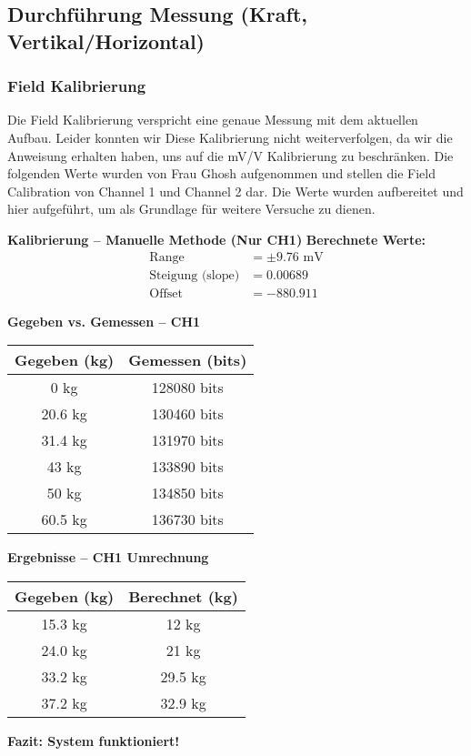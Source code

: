 \subsection{Durchf\"uhrung Messung (Kraft, Vertikal/Horizontal)}
\subsubsection{Field Kalibrierung}
Die Field Kalibrierung verspricht eine genaue Messung mit dem aktuellen Aufbau. Leider konnten wir Diese Kalibrierung nicht weiterverfolgen, da wir die Anweisung erhalten haben, uns auf die mV/V Kalibrierung zu beschränken. 
Die folgenden Werte wurden von Frau Ghosh aufgenommen und stellen die Field Calibration von Channel 1 und Channel 2 dar. Die Werte wurden aufbereitet und hier aufgeführt, um als Grundlage für weitere Versuche zu dienen. 

\textbf{Kalibrierung – Manuelle Methode (Nur CH1)}
\textbf{Berechnete Werte:}
\begin{align*}
\text{Range} &= \pm 9.76 \text{ mV} \\
\text{Steigung (slope)} &= 0.00689 \\
\text{Offset} &= -880.911
\end{align*}

\clearpage
\textbf{Gegeben vs. Gemessen – CH1}
\begin{center}
\begin{tabular}{|c|c|}
\hline
\textbf{Gegeben (kg)} & \textbf{Gemessen (bits)} \\
\hline
0 kg & 128080 bits \\
20.6 kg & 130460 bits \\
31.4 kg & 131970 bits \\
43 kg & 133890 bits \\
50 kg & 134850 bits \\
60.5 kg & 136730 bits \\
\hline
\end{tabular}
\end{center}

\textbf{Ergebnisse – CH1 Umrechnung}
\begin{center}
\begin{tabular}{|c|c|}
\hline
\textbf{Gegeben (kg)} & \textbf{Berechnet (kg)} \\
\hline
15.3 kg & 12 kg \\
24.0 kg & 21 kg \\
33.2 kg & 29.5 kg \\
37.2 kg & 32.9 kg \\
\hline
\end{tabular}
\end{center}
\textbf{Fazit: System funktioniert!}

